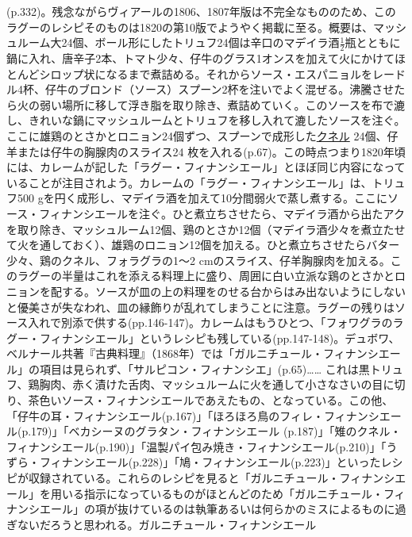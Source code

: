 \begin{recette}
{{{{  (p.332)。残念ながらヴィアールの1806、1807年版は不完全なもののため、このラグーのレシピそのものは1820の第10版でようやく掲載に至る。概要は、マッシュルーム大24個、ボール形にしたトリュフ24個は辛口のマデイラ酒\(\frac{1}{2}\)瓶とともに鍋に入れ、唐辛子2本、トマト少々、仔牛のグラス1オンスを加えて火にかけてほとんどシロップ状になるまで煮詰める。それからソース・エスパニョルをレードル4杯、仔牛のブロンド（ソース）スプーン2杯を注いでよく混ぜる。沸騰させたら火の弱い場所に移して浮き脂を取り除き、煮詰めていく。このソースを布で漉し、きれいな鍋にマッシュルームとトリュフを移し入れて漉したソースを注ぐ。ここに雄鶏のとさかとロニョン24個ずつ、スプーンで成形した\protect\hyperlink{quenelles-diverses}{クネル}
  24個、仔羊または仔牛の胸腺肉のスライス24
  枚を入れる(p.67)。この時点つまり1820年頃には、カレームが記した「ラグー・フィナンシエール」とほぼ同じ内容になっていることが注目されよう。カレームの「ラグー・フィナンシエール」は、トリュフ500
  gを円く成形し、マデイラ酒を加えて10分間弱火で蒸し煮する。ここにソース・フィナンシエールを注ぐ。ひと煮立ちさせたら、マデイラ酒から出たアクを取り除き、マッシュルーム12個、鶏のとさか12個（マデイラ酒少々を煮立たせて火を通しておく）、雄鶏のロニョン12個を加える。ひと煮立ちさせたらバター少々、鶏のクネル、フォラグラの1〜2
  cmのスライス、仔羊胸腺肉を加える。このラグーの半量はこれを添える料理上に盛り、周囲に白い立派な鶏のとさかとロニョンを配する。ソースが皿の上の料理をのせる台からはみ出ないようにしないと優美さが失なわれ、皿の縁飾りが乱れてしまうことに注意。ラグーの残りはソース入れで別添で供する(pp.146-147)。カレームはもうひとつ、「フォワグラのラグー・フィナンシエール」というレシピも残している(pp.147-148)。デュボワ、ベルナール共著『古典料理』（1868年）では「ガルニチュール・フィナンシエール」の項目は見られず、「サルピコン・フィナンシエ」(p.65)\ldots{}\ldots{}
  これは黒トリュフ、鶏胸肉、赤く漬けた舌肉、マッシュルームに火を通して小さなさいの目に切り、茶色いソース・フィナンシエールであえたもの、となっている。この他、「仔牛の耳・フィナンシエール(p.167)」「ほろほろ鳥のフィレ・フィナンシエール(p.179)」「ベカシーヌのグラタン・フィナンシエール
  (p.187)」「雉のクネル・フィナンシエール(p.190)」「温製パイ包み焼き・フィナンシエール(p.210)」「うずら・フィナンシエール(p.228)」「鳩・フィナンシエール(p.223)」といったレシピが収録されている。これらのレシピを見ると「ガルニチュール・フィナンシエール」を用いる指示になっているものがほとんどのため「ガルニチュール・フィナンシエール」の項が抜けているのは執筆あるいは何らかのミスによるものに過ぎないだろうと思われる。}}{ガルニチュール・フィナンシエール}}\label{garniture-a-la-financiere}}


\end{recette}

